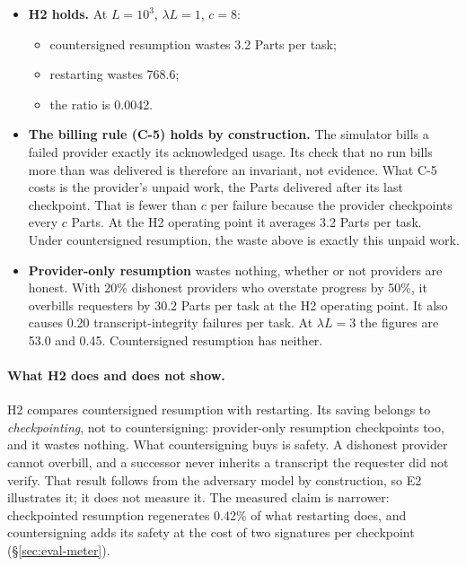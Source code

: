 \begin{itemize}
\item \textbf{H2 holds.} At $L{=}10^3$, $\lambda L{=}1$, $c{=}8$:
  \begin{itemize}
  \item countersigned resumption wastes 3.2 Parts per task;
  \item restarting wastes 768.6;
  \item the ratio is 0.0042.
  \end{itemize}
\item \textbf{The billing rule (C-5) holds by construction.} The
  simulator bills a failed provider exactly its acknowledged usage.
  Its check that no run bills more than was delivered is therefore an
  invariant, not evidence. What C-5 costs is the provider's unpaid work,
  the Parts delivered after its last checkpoint. That is fewer than $c$
  per failure because the provider checkpoints every $c$ Parts. At the
  H2 operating point it averages 3.2 Parts per task. Under countersigned
  resumption, the waste above is exactly this unpaid work.
\item \textbf{Provider-only resumption} wastes nothing, whether or not
  providers are honest. With 20\% dishonest providers who overstate
  progress by 50\%, it overbills requesters by 30.2
  Parts per task at the H2 operating point. It also causes
  0.20 transcript-integrity failures per task. At
  $\lambda L{=}3$ the figures are 53.0 and 0.45.
  Countersigned resumption has neither.
\end{itemize}

\paragraph{What H2 does and does not show.}
H2 compares countersigned resumption with restarting. Its saving belongs
to \emph{checkpointing}, not to countersigning: provider-only resumption
checkpoints too, and it wastes nothing. What countersigning buys is
safety. A dishonest provider cannot overbill, and a successor never
inherits a transcript the requester did not verify. That result follows
from the adversary model by construction, so E2 illustrates it; it does
not measure it. The measured claim is narrower: checkpointed resumption
regenerates 0.42\% of what restarting does, and countersigning adds its
safety at the cost of two signatures per checkpoint (\S\ref{sec:eval-meter}).
